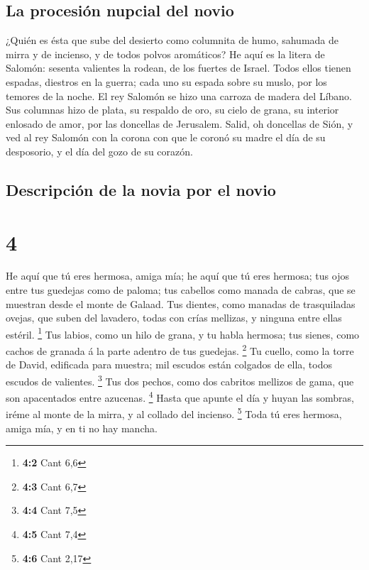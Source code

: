 \hypertarget{la-procesiuxf3n-nupcial-del-novio}{%
\subsection{La procesión nupcial del
novio}\label{la-procesiuxf3n-nupcial-del-novio}}

 ¿Quién es ésta que sube del desierto como columnita de
humo, sahumada de mirra y de incienso, y de todos polvos aromáticos?
 He aquí es la litera de Salomón: sesenta valientes la
rodean, de los fuertes de Israel.  Todos ellos tienen
espadas, diestros en la guerra; cada uno su espada sobre su muslo, por
los temores de la noche.  El rey Salomón se hizo una
carroza de madera del Líbano.  Sus columnas hizo de
plata, su respaldo de oro, su cielo de grana, su interior enlosado de
amor, por las doncellas de Jerusalem.  Salid, oh
doncellas de Sión, y ved al rey Salomón con la corona con que le coronó
su madre el día de su desposorio, y el día del gozo de su corazón.

\hypertarget{descripciuxf3n-de-la-novia-por-el-novio}{%
\subsection{Descripción de la novia por el
novio}\label{descripciuxf3n-de-la-novia-por-el-novio}}

\hypertarget{section-3}{%
\section{4}\label{section-3}}

 He aquí que tú eres hermosa, amiga mía; he aquí que tú
eres hermosa; tus ojos entre tus guedejas como de paloma; tus cabellos
como manada de cabras, que se muestran desde el monte de Galaad.
 Tus dientes, como manadas de trasquiladas ovejas, que
suben del lavadero, todas con crías mellizas, y ninguna entre ellas
estéril. \footnote{\textbf{4:2} Cant 6,6}  Tus labios,
como un hilo de grana, y tu habla hermosa; tus sienes, como cachos de
granada á la parte adentro de tus guedejas. \footnote{\textbf{4:3} Cant
  6,7}  Tu cuello, como la torre de David, edificada para
muestra; mil escudos están colgados de ella, todos escudos de valientes.
\footnote{\textbf{4:4} Cant 7,5}  Tus dos pechos, como dos
cabritos mellizos de gama, que son apacentados entre azucenas.
\footnote{\textbf{4:5} Cant 7,4}  Hasta que apunte el día
y huyan las sombras, iréme al monte de la mirra, y al collado del
incienso. \footnote{\textbf{4:6} Cant 2,17}  Toda tú eres
hermosa, amiga mía, y en ti no hay mancha.

